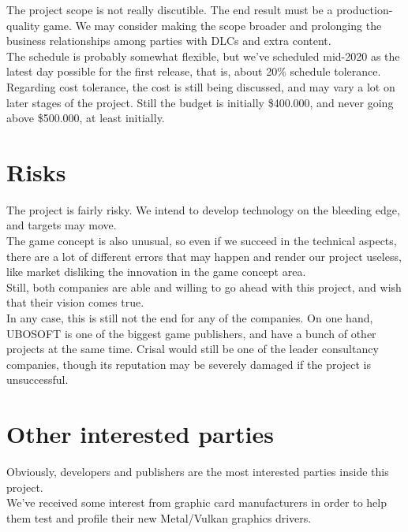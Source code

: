 \documentclass{article}
\begin{document}
  The project scope is not really discutible. The end result must be a
  production-quality game. We may consider making the scope broader and
  prolonging the business relationships among parties with DLCs and extra
  content. \\

  The schedule is probably somewhat flexible, but we've scheduled mid-2020 as
  the latest day possible for the first release, that is, about 20\% schedule
  tolerance. \\

  Regarding cost tolerance, the cost is still being discussed, and may vary a
  lot on later stages of the project. Still the budget is initially \$400.000,
  and never going above \$500.000, at least initially.

\section{Risks}

  The project is fairly risky. We intend to develop technology on the bleeding
  edge, and targets may move. \\

  The game concept is also unusual, so even if we succeed in the technical
  aspects, there are a lot of different errors that may happen and render our
  project useless, like market disliking the innovation in the game concept
  area. \\

  Still, both companies are able and willing to go ahead with this project, and
  wish that their vision comes true. \\

  In any case, this is still not the end for any of the companies. On one hand,
  UBOSOFT is one of the biggest game publishers, and have a bunch of other
  projects at the same time. Crisal would still be one of the leader consultancy
  companies, though its reputation may be severely damaged if the project is
  unsuccessful.

\section{Other interested parties}

  Obviously, developers and publishers are the most interested parties inside
  this project. \\

  We've received some interest from graphic card manufacturers in order to help
  them test and profile their new Metal/Vulkan graphics drivers. \\
\end{document}
